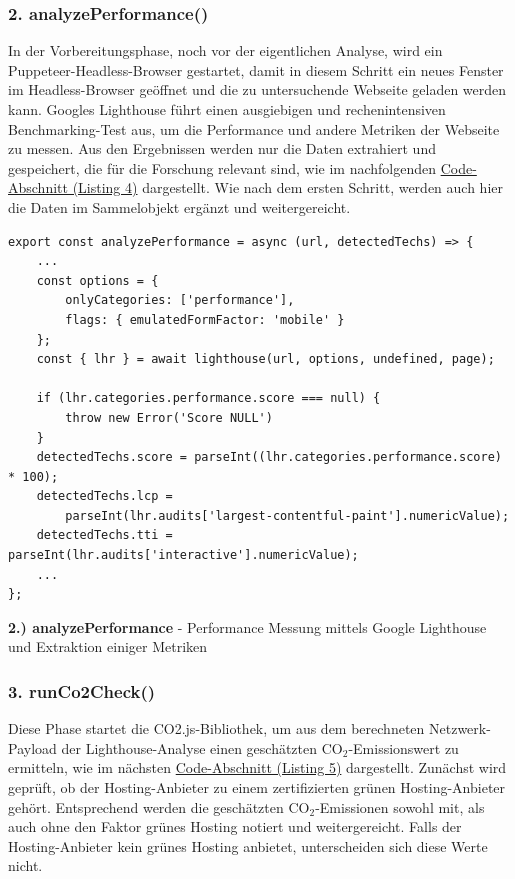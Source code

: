 \documentclass[Bachelor,BIF,german,IEEE]{BASE/twbook}
\begin{document}
\subsubsection{2. analyzePerformance()}
In der Vorbereitungsphase, noch vor der eigentlichen Analyse, wird ein Puppeteer-Headless-Browser gestartet, damit in diesem Schritt ein neues Fenster im Headless-Browser geöffnet und die zu untersuchende Webseite geladen werden kann. Googles Lighthouse führt einen ausgiebigen und rechenintensiven Benchmarking-Test aus, um die Performance und andere Metriken der Webseite zu messen. Aus den Ergebnissen werden nur die Daten extrahiert und gespeichert, die für die Forschung relevant sind, wie im nachfolgenden \hyperref[code:lighthouse]{Code-Abschnitt (Listing 4)} dargestellt. Wie nach dem ersten Schritt, werden auch hier die Daten im Sammelobjekt ergänzt und weitergereicht.

\begin{listing}[htbp]
\begin{verbatim}
export const analyzePerformance = async (url, detectedTechs) => {
    ...
    const options = {
        onlyCategories: ['performance'],
        flags: { emulatedFormFactor: 'mobile' }
    };
    const { lhr } = await lighthouse(url, options, undefined, page);

    if (lhr.categories.performance.score === null) {
        throw new Error('Score NULL')
    }
    detectedTechs.score = parseInt((lhr.categories.performance.score) * 100);
    detectedTechs.lcp = 
        parseInt(lhr.audits['largest-contentful-paint'].numericValue);
    detectedTechs.tti = parseInt(lhr.audits['interactive'].numericValue);
    ...
};
\end{verbatim}
\caption{\textbf{2.) analyzePerformance} - Performance Messung mittels Google Lighthouse und Extraktion einiger Metriken}
\label{code:lighthouse}
\end{listing}

\subsubsection{3. runCo2Check()}
Diese Phase startet die CO2.js-Bibliothek, um aus dem berechneten Netzwerk-Payload der Lighthouse-Analyse einen geschätzten CO$_2$-Emissionswert zu ermitteln, wie im nächsten \hyperref[code:co2]{Code-Abschnitt (Listing 5)} dargestellt. Zunächst wird geprüft, ob der Hosting-Anbieter zu einem zertifizierten \glqq grünen Hosting-Anbieter\grqq{} \cite{GHDB24} gehört. Entsprechend werden die geschätzten CO$_2$-Emissionen sowohl mit, als auch ohne den Faktor grünes Hosting notiert und weitergereicht. Falls der Hosting-Anbieter kein grünes Hosting anbietet, unterscheiden sich diese Werte nicht.
\end{document}
